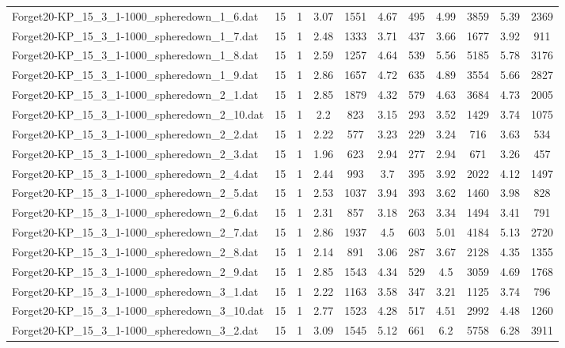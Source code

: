 \begin{table}[!ht]
\begin{tabular}{lcccccccccc}
Forget20-KP\_15\_3\_1-1000\_spheredown\_1\_6.dat & 15 & 1 & 3.07 & 1551 & 4.67 & 495 & 4.99 & 3859 & 5.39 & 2369 \\
Forget20-KP\_15\_3\_1-1000\_spheredown\_1\_7.dat & 15 & 1 & 2.48 & 1333 & 3.71 & 437 & 3.66 & 1677 & 3.92 & 911 \\
Forget20-KP\_15\_3\_1-1000\_spheredown\_1\_8.dat & 15 & 1 & 2.59 & 1257 & 4.64 & 539 & 5.56 & 5185 & 5.78 & 3176 \\
Forget20-KP\_15\_3\_1-1000\_spheredown\_1\_9.dat & 15 & 1 & 2.86 & 1657 & 4.72 & 635 & 4.89 & 3554 & 5.66 & 2827 \\
Forget20-KP\_15\_3\_1-1000\_spheredown\_2\_1.dat & 15 & 1 & 2.85 & 1879 & 4.32 & 579 & 4.63 & 3684 & 4.73 & 2005 \\
Forget20-KP\_15\_3\_1-1000\_spheredown\_2\_10.dat & 15 & 1 & 2.2 & 823 & 3.15 & 293 & 3.52 & 1429 & 3.74 & 1075 \\
Forget20-KP\_15\_3\_1-1000\_spheredown\_2\_2.dat & 15 & 1 & 2.22 & 577 & 3.23 & 229 & 3.24 & 716 & 3.63 & 534 \\
Forget20-KP\_15\_3\_1-1000\_spheredown\_2\_3.dat & 15 & 1 & 1.96 & 623 & 2.94 & 277 & 2.94 & 671 & 3.26 & 457 \\
Forget20-KP\_15\_3\_1-1000\_spheredown\_2\_4.dat & 15 & 1 & 2.44 & 993 & 3.7 & 395 & 3.92 & 2022 & 4.12 & 1497 \\
Forget20-KP\_15\_3\_1-1000\_spheredown\_2\_5.dat & 15 & 1 & 2.53 & 1037 & 3.94 & 393 & 3.62 & 1460 & 3.98 & 828 \\
Forget20-KP\_15\_3\_1-1000\_spheredown\_2\_6.dat & 15 & 1 & 2.31 & 857 & 3.18 & 263 & 3.34 & 1494 & 3.41 & 791 \\
Forget20-KP\_15\_3\_1-1000\_spheredown\_2\_7.dat & 15 & 1 & 2.86 & 1937 & 4.5 & 603 & 5.01 & 4184 & 5.13 & 2720 \\
Forget20-KP\_15\_3\_1-1000\_spheredown\_2\_8.dat & 15 & 1 & 2.14 & 891 & 3.06 & 287 & 3.67 & 2128 & 4.35 & 1355 \\
Forget20-KP\_15\_3\_1-1000\_spheredown\_2\_9.dat & 15 & 1 & 2.85 & 1543 & 4.34 & 529 & 4.5 & 3059 & 4.69 & 1768 \\
Forget20-KP\_15\_3\_1-1000\_spheredown\_3\_1.dat & 15 & 1 & 2.22 & 1163 & 3.58 & 347 & 3.21 & 1125 & 3.74 & 796 \\
Forget20-KP\_15\_3\_1-1000\_spheredown\_3\_10.dat & 15 & 1 & 2.77 & 1523 & 4.28 & 517 & 4.51 & 2992 & 4.48 & 1260 \\
Forget20-KP\_15\_3\_1-1000\_spheredown\_3\_2.dat & 15 & 1 & 3.09 & 1545 & 5.12 & 661 & 6.2 & 5758 & 6.28 & 3911 \\

\end{tabular}
\end{table}
